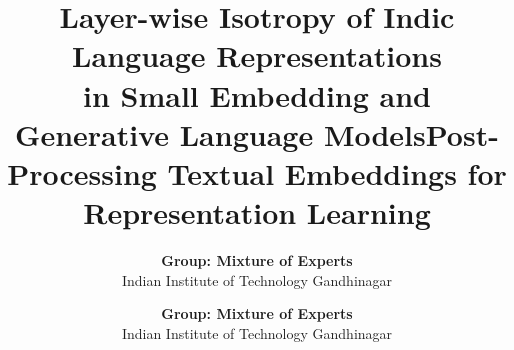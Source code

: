 \documentclass[11pt]{article}
\makeatletter
\let\acl@maketitle\maketitle
\let\acl@@maketitle\@maketitle
\newcommand{\nextpaper}{%
  \clearpage
  \let\maketitle\acl@maketitle
  \let\@maketitle\acl@@maketitle
  \thispagestyle{empty}%
  \pagestyle{empty}%
  \setcounter{section}{0}%
  \setcounter{subsection}{0}%
  \setcounter{figure}{0}%
  \setcounter{table}{0}%
  \setcounter{equation}{0}%
  \gdef\thesection{\arabic{section}}%
  \gdef\thesubsection{\thesection.\arabic{subsection}}%
  \gdef\thefigure{\arabic{figure}}%
  \gdef\thetable{\arabic{table}}%
}
\makeatother
\begin{document}
\title{Layer-wise Isotropy of Indic Language Representations\\in Small Embedding and Generative Language Models}

\author{
  \textbf{Group: Mixture of Experts} \\
  Indian Institute of Technology Gandhinagar
}

\maketitle









\appendix


\nextpaper

\title{Post-Processing Textual Embeddings for Representation Learning}

\author{
  \textbf{Group: Mixture of Experts} \\
  Indian Institute of Technology Gandhinagar
}

\maketitle















\appendix


\clearpage


\nocite{*}

\end{document}
